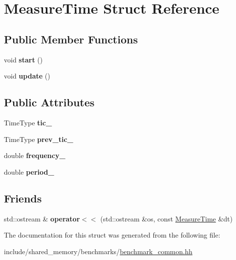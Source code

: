 \hypertarget{structMeasureTime}{}\section{Measure\+Time Struct Reference}
\label{structMeasureTime}
\subsection*{Public Member Functions}
\begin{DoxyCompactItemize}
\item 
\mbox{\label{structMeasureTime_a6ca73f3044c7d89271904c43e2f9dc2c}} 
void {\bfseries start} ()
\item 
\mbox{\label{structMeasureTime_a1714eb45e5ed00a6c90ed36f5d88166a}} 
void {\bfseries update} ()
\end{DoxyCompactItemize}
\subsection*{Public Attributes}
\begin{DoxyCompactItemize}
\item 
\mbox{\label{structMeasureTime_a1bfc128b5d3e0f76e99f809acc985ea2}} 
Time\+Type {\bfseries tic\+\_\+}
\item 
\mbox{\label{structMeasureTime_a7a84fdaf6c46c7de792aca6a13ad6382}} 
Time\+Type {\bfseries prev\+\_\+tic\+\_\+}
\item 
\mbox{\label{structMeasureTime_a5b76f0c97263601aa07d05272e264735}} 
double {\bfseries frequency\+\_\+}
\item 
\mbox{\label{structMeasureTime_a82f4db9bb7b6ae41a8a02d3c25a9a0ff}} 
double {\bfseries period\+\_\+}
\end{DoxyCompactItemize}
\subsection*{Friends}
\begin{DoxyCompactItemize}
\item 
\mbox{\label{structMeasureTime_a610d259dacbe716701935d50ecba7780}} 
std\+::ostream \& {\bfseries operator$<$$<$} (std\+::ostream \&os, const \hyperlink{structMeasureTime}{Measure\+Time} \&dt)
\end{DoxyCompactItemize}


The documentation for this struct was generated from the following file\+:\begin{DoxyCompactItemize}
\item 
include/shared\+\_\+memory/benchmarks/\hyperlink{benchmark__common_8hh}{benchmark\+\_\+common.\+hh}\end{DoxyCompactItemize}
